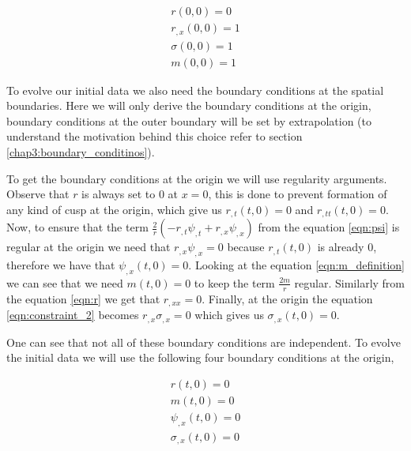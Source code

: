 \begin{eqnarray}
    r(0 ,0) = 0  \\
    r_{,x}(0 ,0) = 1  \\
    \sigma(0 ,0) = 1  \\
    m(0 ,0) = 1
\end{eqnarray}


To evolve our initial data we also need the boundary conditions at the spatial boundaries. Here we will only derive the boundary conditions at the origin, boundary conditions at the outer boundary will be set by extrapolation (to understand the motivation behind this choice refer to section \ref{chap3:boundary_conditinos}).

To get the boundary conditions at the origin we will use regularity arguments.
Observe that $r$ is always set to $0$ at $x=0$, this is done to prevent formation of any kind of cusp at the origin, which give us $r_{,t}(t,0) = 0$ and $r_{,tt}(t,0)=0$.
Now, to ensure that the term $\frac{2}{r}\left(-r_{, t} \psi_{, t}+r_{, x} \psi_{, x}\right)$ from the equation \ref{eqn:psi} is regular at the origin we need that $r_{, x} \psi_{, x} = 0$ because $r_{,t}(t,0)$ is already $0$, therefore we have that $\psi_{,x}(t,0) = 0$. Looking at the equation \ref{eqn:m_definition} we can see that we need $m(t,0) = 0 $ to keep the term $\frac{2 m}{r}$ regular. Similarly from the equation \ref{eqn:r} we get that $r_{,xx}=0$. Finally, at the origin the equation \ref{eqn:constraint_2} becomes $r_{,x} \sigma_{,x} = 0$ which gives us $\sigma_{,x}(t,0) = 0$.


One can see that not all of these boundary conditions are independent. To evolve the initial data we will use the following four boundary conditions at the origin,

\begin{eqnarray}
    r(t,0) = 0 \\
    m(t,0) =0 \\
    \psi_{,x}(t,0) = 0\\
    \sigma_{,x}(t,0) = 0
\end{eqnarray}

